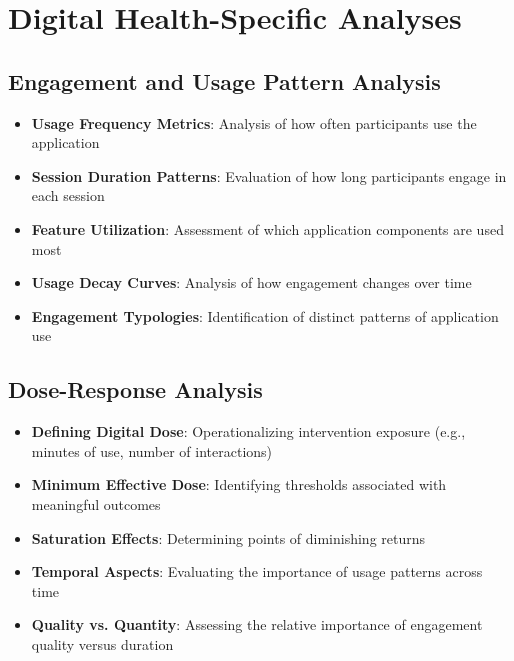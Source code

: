 \section{Digital Health-Specific Analyses}
\subsection{Engagement and Usage Pattern Analysis}
\begin{itemize}
    \item \textbf{Usage Frequency Metrics}: Analysis of how often participants use the application
    
    \item \textbf{Session Duration Patterns}: Evaluation of how long participants engage in each session
    
    \item \textbf{Feature Utilization}: Assessment of which application components are used most
    
    \item \textbf{Usage Decay Curves}: Analysis of how engagement changes over time
    
    \item \textbf{Engagement Typologies}: Identification of distinct patterns of application use
\end{itemize}

\subsection{Dose-Response Analysis}
\begin{itemize}
    \item \textbf{Defining Digital Dose}: Operationalizing intervention exposure (e.g., minutes of use, number of interactions)
    
    \item \textbf{Minimum Effective Dose}: Identifying thresholds associated with meaningful outcomes
    
    \item \textbf{Saturation Effects}: Determining points of diminishing returns
    
    \item \textbf{Temporal Aspects}: Evaluating the importance of usage patterns across time
    
    \item \textbf{Quality vs. Quantity}: Assessing the relative importance of engagement quality versus duration
\end{itemize}

